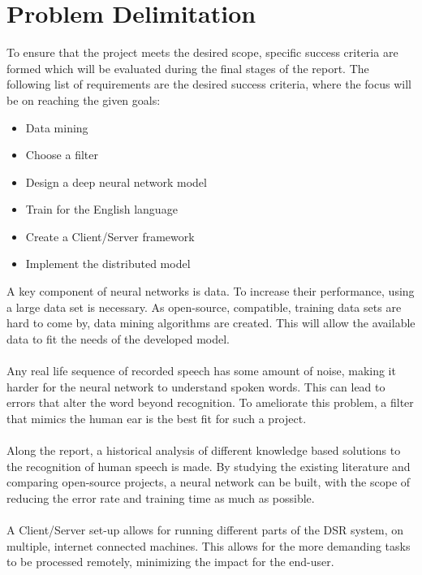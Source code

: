 
\section{Problem Delimitation}\label{sec:PD}
To ensure that the project meets the desired scope,
specific success criteria are formed which will be
evaluated during the final stages of the report.
The following list of requirements are the desired
success criteria, where the focus will be on reaching
the given goals:
\begin{itemize}
	\item Data mining
	\item Choose a filter
	\item Design a deep neural network model
	\item Train for the English language
	\item Create a Client/Server framework
	\item Implement the distributed model
\end{itemize}
A key component of neural networks is data. To increase their performance, using a large data set is necessary. As open-source, compatible, training data sets are hard to come by, data mining algorithms are created. This will allow the available data to fit the needs of the developed model.\\\\
Any real life sequence of recorded speech has some amount of noise, making it harder for the neural network to understand spoken words.
This can lead to errors that alter the word beyond recognition. 
To ameliorate this problem, a filter that mimics the human
ear is the best fit for such a project.\\\\
Along the report, a historical analysis of different knowledge
based solutions to the recognition of human speech is made.
By studying the existing literature and comparing open-source projects, a neural network can be built, with the scope of reducing the error rate and training time as much
as possible.\\\\
A Client/Server set-up allows for running different parts of the DSR system, on multiple, internet connected machines. This allows for the more demanding tasks to be processed remotely, minimizing the impact for the end-user.

